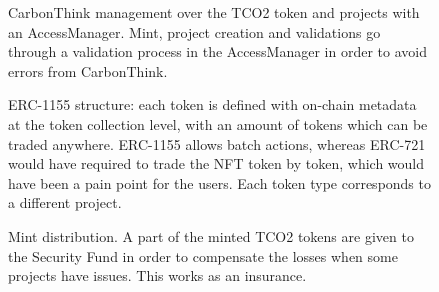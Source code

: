 \documentclass[a4paper, 12pt]{article}
\begin{document}
\begin{figure}[H]
    \centering
    \caption{CarbonThink management over the TCO2 token and projects with an AccessManager. Mint, project creation and validations go through a validation process in the AccessManager in order to avoid errors from CarbonThink.}
    \label{fig:carbonthink-accessmanager}
\end{figure}

\begin{figure}[H]
    \centering
    \caption{ERC-1155 structure: each token is defined with on-chain metadata at the token collection level, with an amount of tokens which can be traded anywhere. ERC-1155 allows batch actions, whereas ERC-721 would have required to trade the NFT token by token, which would have been a pain point for the users. Each token type corresponds to a different project.}
    \label{fig:erc-1155}
\end{figure}

\begin{figure}[H]
    \centering
    \caption{Mint distribution. A part of the minted TCO2 tokens are given to the Security Fund in order to compensate the losses when some projects have issues. This works as an insurance.}
    \label{fig:mint-distribution}
\end{figure}
\end{document}
